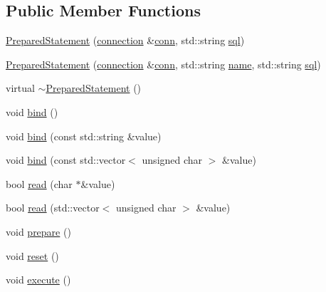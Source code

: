 \subsection*{Public Member Functions}
\begin{DoxyCompactItemize}
\item 
\hyperlink{classdbo_1_1stmt_1_1_prepared_statement_a2631fb8e5b366e15a9bb10061572ed51}{Prepared\+Statement} (\hyperlink{classdbo_1_1connection}{connection} \&\hyperlink{classdbo_1_1stmt_1_1_prepared_statement_acb0c5498031d397325904b976581864e}{conn}, std\+::string \hyperlink{classdbo_1_1stmt_1_1_prepared_statement_a5413f8367e7cfcba4a2dfedc11726509}{sql})
\item 
\hyperlink{classdbo_1_1stmt_1_1_prepared_statement_a1bb85967c151e6f56118a9602fecc05c}{Prepared\+Statement} (\hyperlink{classdbo_1_1connection}{connection} \&\hyperlink{classdbo_1_1stmt_1_1_prepared_statement_acb0c5498031d397325904b976581864e}{conn}, std\+::string \hyperlink{classdbo_1_1stmt_1_1_prepared_statement_ad27a0d0ecf8fbe1105ab31d22474a63b}{name}, std\+::string \hyperlink{classdbo_1_1stmt_1_1_prepared_statement_a5413f8367e7cfcba4a2dfedc11726509}{sql})
\item 
virtual \hyperlink{classdbo_1_1stmt_1_1_prepared_statement_a68db1a3435118b1d0c5b083c75ea875c}{$\sim$\+Prepared\+Statement} ()
\item 
void \hyperlink{classdbo_1_1stmt_1_1_prepared_statement_a09a9cd82a4d0123b679312acf74fbd02}{bind} ()
\item 
void \hyperlink{classdbo_1_1stmt_1_1_prepared_statement_a50a8195e7156004c2bf8533a89eb4541}{bind} (const std\+::string \&value)
\item 
void \hyperlink{classdbo_1_1stmt_1_1_prepared_statement_ac569d72f107737acda7ce94c831f5838}{bind} (const std\+::vector$<$ unsigned char $>$ \&value)
\item 
bool \hyperlink{classdbo_1_1stmt_1_1_prepared_statement_ab01ebe611bfdb2a17cc10e7edbb29d4f}{read} (char $\ast$\&value)
\item 
bool \hyperlink{classdbo_1_1stmt_1_1_prepared_statement_a65620d8b28b279d717ed6a787f89ad70}{read} (std\+::vector$<$ unsigned char $>$ \&value)
\item 
void \hyperlink{classdbo_1_1stmt_1_1_prepared_statement_af8ff3a55a05835495670260a71b42fcd}{prepare} ()
\item 
void \hyperlink{classdbo_1_1stmt_1_1_prepared_statement_ac046e6ccc339333d7049ec77bd156f7a}{reset} ()
\item 
void \hyperlink{classdbo_1_1stmt_1_1_prepared_statement_a1f14d39e3ce01f550527b606ec7e16ab}{execute} ()

\end{DoxyCompactItemize}

